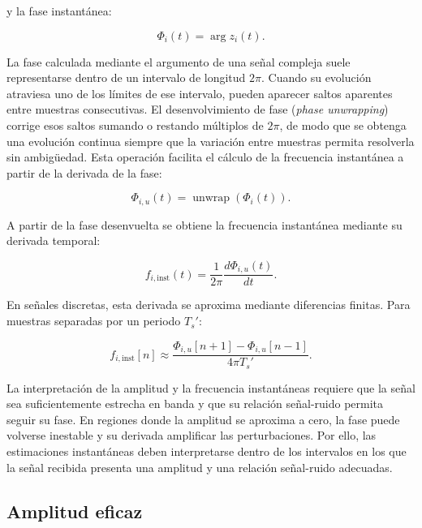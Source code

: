 y la fase instantánea:

\begin{equation}
    \Phi_i(t)
    =
    \arg z_i(t).
    \label{eq:fase_instantanea}
\end{equation}

La fase calculada mediante el argumento de una señal compleja suele
representarse dentro de un intervalo de longitud $2\pi$. Cuando su
evolución atraviesa uno de los límites de ese intervalo, pueden aparecer
saltos aparentes entre muestras consecutivas. El desenvolvimiento de
fase (\textit{phase unwrapping}) corrige esos saltos sumando o restando
múltiplos de $2\pi$, de modo que se obtenga una evolución continua
siempre que la variación entre muestras permita resolverla sin
ambigüedad. Esta operación facilita el cálculo de la frecuencia
instantánea a partir de la derivada de la fase:

\begin{equation}
    \Phi_{i,u}(t)
    =
    \operatorname{unwrap}(\Phi_i(t)).
\end{equation}

A partir de la fase desenvuelta se obtiene la frecuencia instantánea
mediante su derivada temporal:

\begin{equation}
    f_{i,\mathrm{inst}}(t)
    =
    \frac{1}{2\pi}
    \frac{d\Phi_{i,u}(t)}{dt}.
    \label{eq:frecuencia_instantanea}
\end{equation}

En señales discretas, esta derivada se aproxima mediante diferencias
finitas. Para muestras separadas por un periodo $T_s'$:

\begin{equation}
    f_{i,\mathrm{inst}}[n]
    \approx
    \frac{
        \Phi_{i,u}[n+1]-\Phi_{i,u}[n-1]
    }{4\pi T_s'}.
    \label{eq:frecuencia_instantanea_discreta}
\end{equation}

La interpretación de la amplitud y la frecuencia instantáneas requiere
que la señal sea suficientemente estrecha en banda y que su relación
señal-ruido permita seguir su fase. En regiones donde la amplitud se
aproxima a cero, la fase puede volverse inestable y su derivada amplificar
las perturbaciones. Por ello, las estimaciones instantáneas deben
interpretarse dentro de los intervalos en los que la señal recibida
presenta una amplitud y una relación señal-ruido adecuadas.

\subsection*{Amplitud eficaz}


